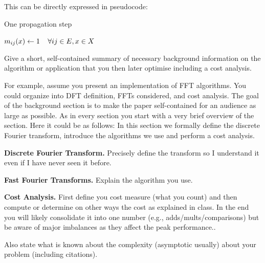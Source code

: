 \documentclass[letterpaper]{article}
\newcommand{\mypar}[1]{{\bf #1.}}
\begin{document}
This can be directly expressed in pseudocode:

\def\lineAlgoPropagateForI{4}
\def\lineAlgoPropagateCalcProduct{9}
\begin{algorithm}
\caption{One propagation step}
\label{algo:propagate}
\algodefaults
	$m_{ij}(x) \leftarrow 1\mkern 20mu\forall ij \in E, x \in X$\;
\end{algorithm}



Give a short, self-contained summary of necessary
background information on the algorithm or application that you then later optimise including a cost analysis.

For example, assume you present an
implementation of FFT algorithms. You could organize into DFT
definition, FFTs considered, and cost analysis. The goal of the
background section is to make the paper self-contained for an audience
as large as possible. As in every section
you start with a very brief overview of the section. Here it could be as follows: In this section
we formally define the discrete Fourier transform, introduce the algorithms we use
and perform a cost analysis.

\mypar{Discrete Fourier Transform}
Precisely define the transform so I understand it even if I have never
seen it before.

\mypar{Fast Fourier Transforms}
Explain the algorithm you use.

\mypar{Cost Analysis}
First define you cost measure (what you count) and then compute or determine on other ways the
cost as explained in class. In the end you will likely consolidate it into one number (e.g., adds/mults/comparisons) but be aware of major imbalances as they affect the peak performance..

Also state what is known about the complexity (asymptotic usually)
about your problem (including citations).
\end{document}
